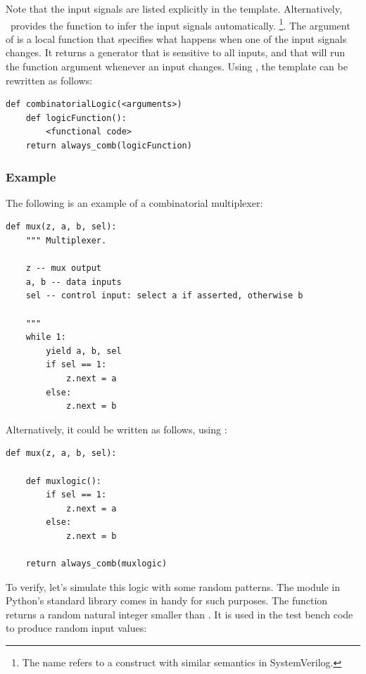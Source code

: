 Note that the input signals are listed explicitly in the
template. Alternatively, \myhdl\ provides the 
function to infer the input signals automatically. 
\footnote{The name  refers to
a construct with similar semantics in SystemVerilog.}.
The argument of
 is a local function that specifies
what happens when one of the input signals
changes. It returns a generator that is
sensitive to all inputs, and that will run the function argument
whenever an input changes. Using , the template
can be rewritten as follows:

\begin{verbatim}
def combinatorialLogic(<arguments>)
    def logicFunction():
        <functional code>
    return always_comb(logicFunction)
\end{verbatim}


\subsubsection{Example \label{model-comb-ex}}

The following is an example of a combinatorial multiplexer:

\begin{verbatim}
def mux(z, a, b, sel):
    """ Multiplexer.
    
    z -- mux output
    a, b -- data inputs
    sel -- control input: select a if asserted, otherwise b

    """
    while 1:
        yield a, b, sel
        if sel == 1:
            z.next = a
        else:
            z.next = b
\end{verbatim}

Alternatively, it could be written as follows, using
:

\begin{verbatim}
def mux(z, a, b, sel):

    def muxlogic():
        if sel == 1:
            z.next = a
        else:
            z.next = b

    return always_comb(muxlogic)
\end{verbatim}

To verify, let's simulate this logic with some random patterns. The
 module in Python's standard library comes in handy for
such purposes. The function  returns a random
natural integer smaller than . It is used in the test bench
code to produce random input values:


